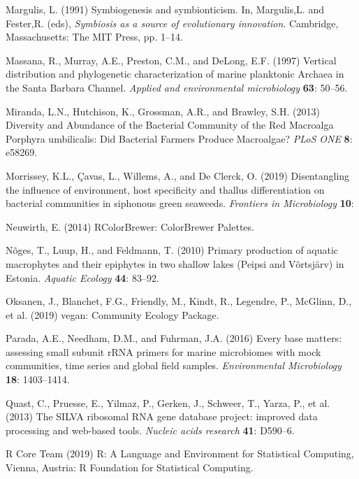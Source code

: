 \documentclass[12pt,]{article}
\begin{document}
\leavevmode\hypertarget{ref-Margulis1991}{}%
Margulis, L. (1991) Symbiogenesis and symbionticism. In, Margulis,L. and
Fester,R. (eds), \emph{Symbiosis as a source of evolutionary
innovation}. Cambridge, Massachusetts: The MIT Press, pp. 1--14.

\leavevmode\hypertarget{ref-Massana1997}{}%
Massana, R., Murray, A.E., Preston, C.M., and DeLong, E.F. (1997)
Vertical distribution and phylogenetic characterization of marine
planktonic Archaea in the Santa Barbara Channel. \emph{Applied and
environmental microbiology} \textbf{63}: 50--56.

\leavevmode\hypertarget{ref-Miranda2013}{}%
Miranda, L.N., Hutchison, K., Grossman, A.R., and Brawley, S.H. (2013)
Diversity and Abundance of the Bacterial Community of the Red Macroalga
Porphyra umbilicalis: Did Bacterial Farmers Produce Macroalgae?
\emph{PLoS ONE} \textbf{8}: e58269.

\leavevmode\hypertarget{ref-Morrissey2019}{}%
Morrissey, K.L., Çavas, L., Willems, A., and De Clerck, O. (2019)
Disentangling the influence of environment, host specificity and thallus
differentiation on bacterial communities in siphonous green seaweeds.
\emph{Frontiers in Microbiology} \textbf{10}:

\leavevmode\hypertarget{ref-Neuwirth2014}{}%
Neuwirth, E. (2014) RColorBrewer: ColorBrewer Palettes.

\leavevmode\hypertarget{ref-Noges2010}{}%
Nõges, T., Luup, H., and Feldmann, T. (2010) Primary production of
aquatic macrophytes and their epiphytes in two shallow lakes (Peipsi and
Võrtsjärv) in Estonia. \emph{Aquatic Ecology} \textbf{44}: 83--92.

\leavevmode\hypertarget{ref-Oksanen2019}{}%
Oksanen, J., Blanchet, F.G., Friendly, M., Kindt, R., Legendre, P.,
McGlinn, D., et al. (2019) vegan: Community Ecology Package.

\leavevmode\hypertarget{ref-Parada2016}{}%
Parada, A.E., Needham, D.M., and Fuhrman, J.A. (2016) Every base
matters: assessing small subunit rRNA primers for marine microbiomes
with mock communities, time series and global field samples.
\emph{Environmental Microbiology} \textbf{18}: 1403--1414.

\leavevmode\hypertarget{ref-Quast2013}{}%
Quast, C., Pruesse, E., Yilmaz, P., Gerken, J., Schweer, T., Yarza, P.,
et al. (2013) The SILVA ribosomal RNA gene database project: improved
data processing and web-based tools. \emph{Nucleic acids research}
\textbf{41}: D590--6.

\leavevmode\hypertarget{ref-RCoreTeam2019}{}%
R Core Team (2019) R: A Language and Environment for Statistical
Computing, Vienna, Austria: R Foundation for Statistical Computing.
\end{document}
